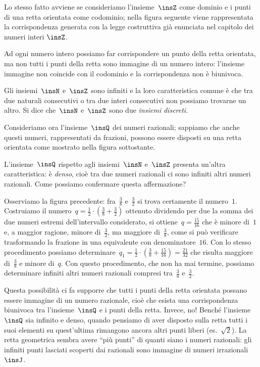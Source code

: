 Lo stesso fatto avviene se consideriamo l'insieme~$\insZ$ come dominio e i punti di una retta orientata come codominio;
nella figura seguente viene rappresentata la corrispondenza generata con la legge costruttiva già enunciata nel capitolo dei numeri interi $\insZ$.
\begin{center}
 
\end{center}
Ad ogni numero intero possiamo far corrispondere un punto della retta orientata, ma non tutti i punti della retta sono immagine
di un numero intero: l'insieme immagine non coincide con il codominio e la corrispondenza non è biunivoca.

Gli insiemi~$\insN$ e~$\insZ$ sono infiniti e la loro caratteristica comune è che tra due naturali consecutivi o tra due interi consecutivi
non possiamo trovarne un altro. Si dice che~$\insN$ e~$\insZ$ sono due \emph{insiemi discreti}.

Consideriamo ora l'insieme~$\insQ$ dei numeri razionali; sappiamo che anche questi numeri, rappresentati da frazioni, possono essere disposti
su una retta orientata come mostrato nella figura sottostante.
\begin{center}
 
\end{center}
L'insieme~$\insQ$ rispetto agli insiemi~$\insN$ e~$\insZ$ presenta un'altra caratteristica: è \emph{denso}, cioè tra due numeri razionali
ci sono infiniti altri numeri razionali.
Come possiamo confermare questa affermazione?

Osserviamo la figura precedente: fra~$\frac{3}{8}$ e~$\frac{3}{2}$ si trova certamente il numero~$1$.
Costruiamo il numero~$q=\frac{1}{2} \cdot \left(\frac{3}{8}+\frac{3}{2}\right)$ ottenuto dividendo per due la somma dei due numeri estremi
dell'intervallo considerato, si ottiene~$q=\frac{15}{16}$ che è minore di~$1$ e, a maggior ragione, minore di~$\frac{3}{2}$,
ma maggiore di~$\frac{3}{8}$, come si può verificare trasformando la frazione in una equivalente con denominatore~$16$.
Con lo stesso procedimento possiamo determinare~$q_{1}=\frac{1}{2}\cdot \left(\frac{3}{8}+\frac{15}{16}\right)=\frac{21}{32}$
che risulta maggiore di~$\frac{3}{8}$ e minore di~$q$. Con questo procedimento, che non ha mai termine, possiamo determinare
infiniti altri numeri razionali compresi tra~$\frac{3}{8}$ e~$\frac{3}{2}$.
\begin{center}
 
\end{center}

Questa possibilità ci fa supporre che tutti i punti della retta orientata possano essere immagine di un numero razionale,
cioè che esista una corrispondenza biunivoca tra l'insieme~$\insQ$ e i punti della retta.
Invece, no!
Benché l'insieme~$\insQ$ sia infinito e denso,
quando pensiamo di aver disposto sulla retta tutti i suoi elementi su quest'ultima rimangono ancora altri punti liberi (es.~$\sqrt{2}$).
La retta geometrica sembra avere ``più punti'' di quanti siano i numeri razionali: gli infiniti punti lasciati scoperti dai razionali
sono immagine di numeri irrazionali $\insJ$.

